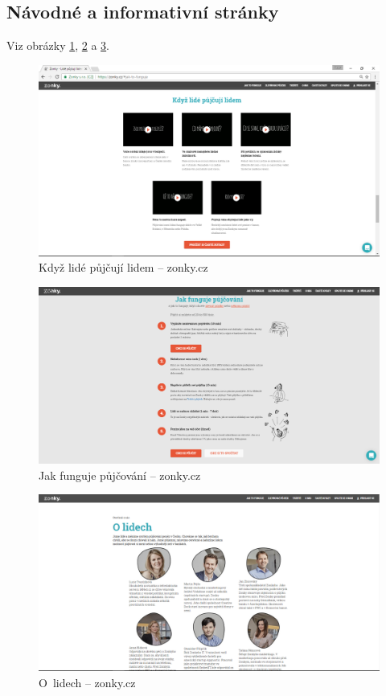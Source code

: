 \subsection{Návodné a informativní stránky}
Viz obrázky \ref{fig:zonky:info}, \ref{fig:zonky:info2} a \ref{fig:zonky:info3}.
\begin{figure}[h]
    \centering
    \includegraphics[width=1.0\textwidth]{media/zonky/info.png}
    \caption{Když lidé půjčují lidem -- zonky.cz}
    \label{fig:zonky:info}
\end{figure}
\begin{figure}[h]
    \centering
    \includegraphics[width=1.0\textwidth]{media/zonky/info2.png}
    \caption{Jak funguje půjčování -- zonky.cz}
    \label{fig:zonky:info2}
\end{figure}
\begin{figure}[h]
    \centering
    \includegraphics[width=1.0\textwidth]{media/zonky/info3.png}
    \caption{O~lidech -- zonky.cz}
    \label{fig:zonky:info3}
\end{figure}
